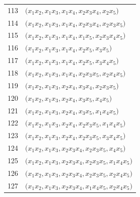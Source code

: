 {\begin{longtable}{@{}r>{\raggedright\arraybackslash}p{}@{}}
113 & \(\bigl(x_{1}x_{2},\allowbreak x_{1}x_{3},\allowbreak x_{1}x_{4},\allowbreak x_{2}x_{3}x_{4},\allowbreak x_{2}x_{5}\bigr)\) \\
114 & \(\bigl(x_{1}x_{2},\allowbreak x_{1}x_{3},\allowbreak x_{1}x_{4},\allowbreak x_{2}x_{3}x_{4},\allowbreak x_{2}x_{3}x_{5}\bigr)\) \\
115 & \(\bigl(x_{1}x_{2},\allowbreak x_{1}x_{3},\allowbreak x_{1}x_{4},\allowbreak x_{1}x_{5},\allowbreak x_{2}x_{3}x_{4}x_{5}\bigr)\) \\
116 & \(\bigl(x_{1}x_{2},\allowbreak x_{1}x_{3},\allowbreak x_{1}x_{4},\allowbreak x_{2}x_{5},\allowbreak x_{3}x_{5}\bigr)\) \\
117 & \(\bigl(x_{1}x_{2},\allowbreak x_{1}x_{3},\allowbreak x_{1}x_{4},\allowbreak x_{2}x_{5},\allowbreak x_{3}x_{4}x_{5}\bigr)\) \\
118 & \(\bigl(x_{1}x_{2},\allowbreak x_{1}x_{3},\allowbreak x_{1}x_{4},\allowbreak x_{2}x_{3}x_{5},\allowbreak x_{2}x_{4}x_{5}\bigr)\) \\
119 & \(\bigl(x_{1}x_{2},\allowbreak x_{1}x_{3},\allowbreak x_{2}x_{4},\allowbreak x_{3}x_{4},\allowbreak x_{2}x_{3}x_{5}\bigr)\) \\
120 & \(\bigl(x_{1}x_{2},\allowbreak x_{1}x_{3},\allowbreak x_{2}x_{4},\allowbreak x_{3}x_{5},\allowbreak x_{4}x_{5}\bigr)\) \\
121 & \(\bigl(x_{1}x_{2},\allowbreak x_{1}x_{3},\allowbreak x_{2}x_{4},\allowbreak x_{3}x_{5},\allowbreak x_{1}x_{4}x_{5}\bigr)\) \\
122 & \(\bigl(x_{1}x_{2},\allowbreak x_{1}x_{3},\allowbreak x_{2}x_{4},\allowbreak x_{2}x_{3}x_{5},\allowbreak x_{1}x_{4}x_{5}\bigr)\) \\
123 & \(\bigl(x_{1}x_{2},\allowbreak x_{1}x_{3},\allowbreak x_{2}x_{4},\allowbreak x_{2}x_{3}x_{5},\allowbreak x_{3}x_{4}x_{5}\bigr)\) \\
124 & \(\bigl(x_{1}x_{2},\allowbreak x_{1}x_{3},\allowbreak x_{2}x_{3}x_{4},\allowbreak x_{2}x_{3}x_{5},\allowbreak x_{4}x_{5}\bigr)\) \\
125 & \(\bigl(x_{1}x_{2},\allowbreak x_{1}x_{3},\allowbreak x_{2}x_{3}x_{4},\allowbreak x_{2}x_{3}x_{5},\allowbreak x_{1}x_{4}x_{5}\bigr)\) \\
126 & \(\bigl(x_{1}x_{2},\allowbreak x_{1}x_{3},\allowbreak x_{2}x_{3}x_{4},\allowbreak x_{2}x_{3}x_{5},\allowbreak x_{2}x_{4}x_{5}\bigr)\) \\
127 & \(\bigl(x_{1}x_{2},\allowbreak x_{1}x_{3},\allowbreak x_{2}x_{3}x_{4},\allowbreak x_{1}x_{4}x_{5},\allowbreak x_{2}x_{4}x_{5}\bigr)\) \\

\end{longtable}}
